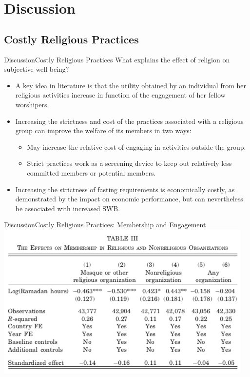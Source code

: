 \documentclass[pdftex,12pt,xcolor=pdftex,table]{beamer}
\begin{document}
\section{Discussion}
\subsection{Costly Religious Practices}
    \begin{frame}{Discussion}{Costly Religious Practices}
    What explains the effect of religion on subjective  well-being? 
    \begin{itemize}
        \item<2-> A key idea in literature is that the utility obtained by an individual from her religious activities increase in function of the engagement of her fellow worshipers.
        \item<3-> Increasing the strictness and cost of the practices associated with a religious group can improve the welfare of its members in two ways: 
        \begin{itemize}
            \item<4-> May increase the relative cost of engaging in activities outside the group.
            \item<5-> Strict practices work as a screening device to keep out relatively less committed members or potential members.
        \end{itemize}
        \item<6->  Increasing the strictness of fasting requirements is economically costly, as demonstrated by the impact on economic performance, but can nevertheless be associated with increased SWB.
    \end{itemize}

    \end{frame}


    \begin{frame}{Discussion}{Costly Religious Practices: Membership and Engagement}
    \vspace{0.0cm}
    \centering\includegraphics[scale=0.5]{tab3.png}

    \end{frame}
\end{document}
